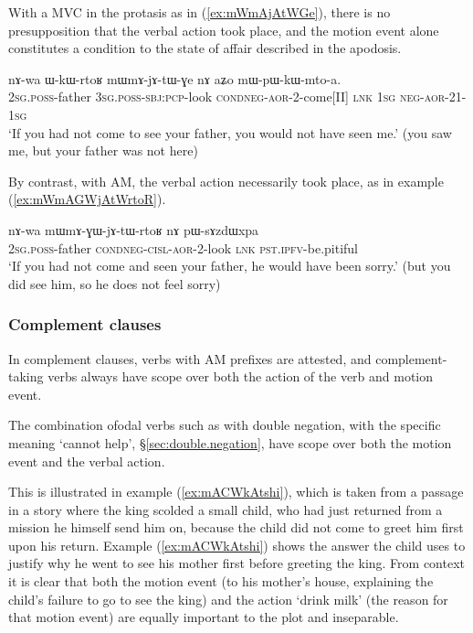 With a MVC in the protasis as in (\ref{ex:mWmAjAtWGe}), there is no presupposition that the verbal action took place, and the motion event alone constitutes a condition to the state of affair described in the apodosis.

\begin{exe}
\ex \label{ex:mWmAjAtWGe}
\gll nɤ-wa ɯ-kɯ-rtoʁ mɯ\redp{}mɤ-jɤ-tɯ-ɣe nɤ aʑo mɯ-pɯ-kɯ-mto-a. \\
\textsc{2sg}.\textsc{poss}-father \textsc{3sg}.\textsc{poss}-\textsc{sbj}:\textsc{pcp}-look \textsc{cond}\redp{}\textsc{neg}-\textsc{aor}-2-come[II] \textsc{lnk} \textsc{1sg} \textsc{neg}-\textsc{aor}-2\fl{}1-\textsc{1sg} \\
\glt `If you had not come to see your father, you would not have seen me.' (you saw me, but your father was not here)
\end{exe}

By contrast, with AM, the verbal action necessarily took place, as in example (\ref{ex:mWmAGWjAtWrtoR}).

\begin{exe}
\ex \label{ex:mWmAGWjAtWrtoR}
\gll nɤ-wa  mɯ\redp{}mɤ-ɣɯ-jɤ-tɯ-rtoʁ nɤ pɯ-sɤzdɯxpa \\
\textsc{2sg}.\textsc{poss}-father \textsc{cond}\redp{}\textsc{neg}-\textsc{cisl}-\textsc{aor}-2-look \textsc{lnk} \textsc{pst}.\textsc{ipfv}-be.pitiful \\ 
\glt `If you had not come and seen your father, he would have been sorry.' (but you did see him, so he does not feel sorry)
\end{exe}

\subsubsection{Complement clauses} \label{sec:am.complement}
In complement clauses, verbs with AM prefixes are attested, and com\-ple\-ment-taking verbs always have scope over both the action of the verb and motion event.

The combination ofodal verbs such as  with double negation, with the specific meaning `cannot help', §\ref{sec:double.negation}, have scope over both the motion event and the verbal action. 

This is illustrated in example (\ref{ex:mACWkAtshi}), which is taken from a passage in a story where the king scolded a small child, who had just returned from a mission he himself send him on, because the child did not come to greet him first upon his return. Example (\ref{ex:mACWkAtshi}) shows the answer the child uses to justify why he went to see his mother first before greeting the king. From  context it is clear that both the motion event (to his mother's house, explaining the child's failure to go to see the king) and the action `drink milk' (the reason for that motion event) are equally important to the plot and inseparable. 

